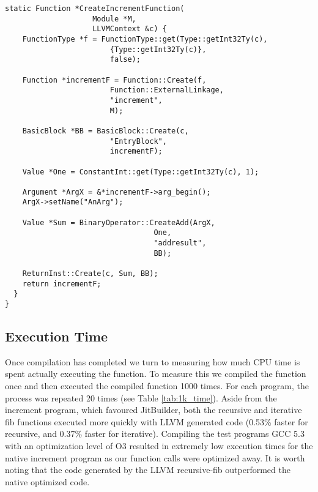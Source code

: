 \begin{lstlisting}[float,floatplacement=H,
  caption={Generating MCJIT IR for the increment program.},
  label=lst:llvm_increment]
  static Function *CreateIncrementFunction(
                    Module *M, 
                    LLVMContext &c) {
    FunctionType *f = FunctionType::get(Type::getInt32Ty(c), 
                        {Type::getInt32Ty(c)}, 
                        false);
    
    Function *incrementF = Function::Create(f, 
                        Function::ExternalLinkage, 
                        "increment", 
                        M);

    BasicBlock *BB = BasicBlock::Create(c, 
                        "EntryBlock", 
                        incrementF);
    
    Value *One = ConstantInt::get(Type::getInt32Ty(c), 1);
    
    Argument *ArgX = &*incrementF->arg_begin(); 
    ArgX->setName("AnArg");
  
    Value *Sum = BinaryOperator::CreateAdd(ArgX, 
                                  One,
                                  "addresult", 
                                  BB);
  
    ReturnInst::Create(c, Sum, BB);
    return incrementF;
  }
}\end{lstlisting}

\subsection{Execution Time}
Once compilation has completed we turn to measuring how much CPU time is spent actually executing the function.
To measure this we compiled the function once and then executed the compiled function 1000 times.
For each program, the process was repeated 20 times (see Table \ref{tab:1k_time}).
Aside from the increment program, which favoured JitBuilder, both the recursive and iterative fib functions executed more quickly with LLVM generated code (0.53\% faster for recursive, and 0.37\% faster for iterative).
Compiling the test programs GCC 5.3 with an optimization level of O3 resulted in extremely low execution times for the native increment program as our function calls were optimized away.
It is worth noting that the code generated by the LLVM recursive-fib outperformed the native optimized code.

